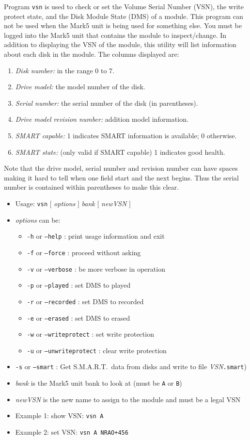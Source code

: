 Program {\tt vsn} is used to check or set the Volume Serial Number (VSN), the write protect state, and the Disk Module State (DMS) of a module.
This program can not be used when the Mark5 unit is being used for something else.
You must be logged into the Mark5 unit that contains the module to inspect/change.
In addition to displaying the VSN of the module, this utility will list information about each disk in the module.
The columns displayed are:

\begin{enumerate}
\item {\em Disk number:} in the range 0 to 7.
\item {\em Drive model:} the model number of the disk.
\item {\em Serial number:} the serial number of the disk (in parentheses).
\item {\em Drive model revision number:} addition model information.
\item {\em SMART capable:} 1 indicates SMART information is available; 0 otherwise.
\item {\em SMART state:} (only valid if SMART capable) 1 indicates good health.
\end{enumerate}

Note that the drive model, serial number and revision number can have spaces making it hard to tell when one field start and the next begins.
Thus the serial number is contained within parentheses to make this clear.

\begin{itemize}
\item[] Usage: {\tt vsn} $[$ {\em options} $]$ {\em bank} $[$ {\em newVSN} $]$
\item[] {\em options} can be:
\begin{itemize}
\item[] {\tt -h} or {\tt --help} : print usage information and exit
\item[] {\tt -f} or {\tt --force} : proceed without asking
\item[] {\tt -v} or {\tt --verbose} : be more verbose in operation
\item[] {\tt -p} or {\tt --played} : set DMS to played
\item[] {\tt -r} or {\tt --recorded} : set DMS to recorded
\item[] {\tt -e} or {\tt --erased} : set DMS to erased
\item[] {\tt -w} or {\tt --writeprotect} : set write protection
\item[] {\tt -u} or {\tt --unwriteprotect} : clear write protection
\end{itemize}
\item[] {\tt -s} or {\tt --smart} : Get S.M.A.R.T.\ data from disks and write to file {\em VSN}{\tt .smart})
\item[] {\em bank} is the Mark5 unit bank to look at (must be {\tt A} or {\tt B})
\item[] {\em newVSN} is the new name to assign to the module and must be a legal VSN
\item[] Example 1: show VSN: {\tt vsn A}
\item[] Example 2: set VSN: {\tt vsn A NRAO+456}
\end{itemize}


